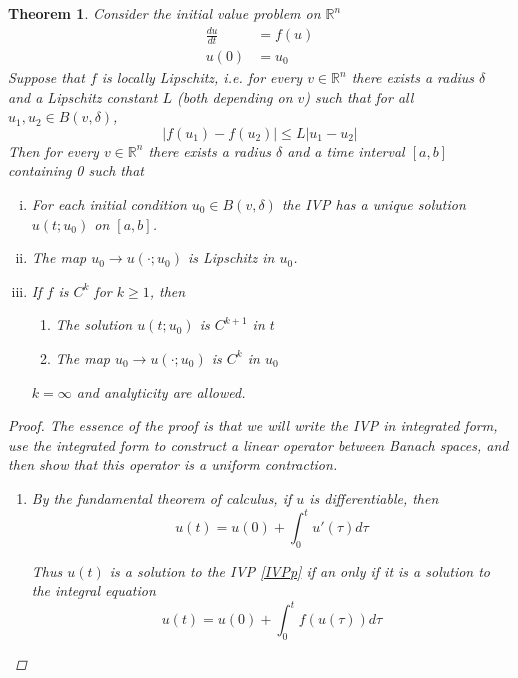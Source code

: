 \documentclass{article}
\newtheorem{theorem}{Theorem}[section]
\def\R{{\mathbb R}}
\begin{document}
\begin{theorem}
Consider the initial value problem on $\R^n$
\begin{align}\label{IVPp}
\frac{du}{dt} &= f(u) \\
u(0) &= u_0 \nonumber
\end{align}
Suppose that $f$ is locally Lipschitz, i.e. for every $v \in \R^n$ there exists a radius $\delta$ and a Lipschitz constant $L$ (both depending on $v$) such that for all $u_1, u_2 \in B(v, \delta)$,
\[
|f(u_1) - f(u_2)| \leq L|u_1 - u_2|
\]
Then for every $v \in \R^n$ there exists a radius $\delta$ and a time interval $[a, b]$ containing 0 such that
\begin{enumerate}[(i)]
\item For each initial condition $u_0 \in B(v, \delta)$ the IVP has a unique solution $u(t; u_0)$ on $[a, b]$.
\item The map $u_0 \rightarrow u(\cdot; u_0)$ is Lipschitz in $u_0$.
\item If $f$ is $C^k$ for $k \geq 1$, then
\begin{enumerate}
\item The solution $u(t; u_0)$ is $C^{k+1}$ in $t$
\item The map $u_0 \rightarrow u(\cdot; u_0)$ is $C^k$ in $u_0$
\end{enumerate}
$k = \infty$ and analyticity are allowed.
\end{enumerate}
\begin{proof}
The essence of the proof is that we will write the IVP in integrated form, use the integrated form to construct a linear operator between Banach spaces, and then show that this operator is a uniform contraction.
\begin{enumerate}
\item By the fundamental theorem of calculus, if $u$ is differentiable, then
\begin{equation*}
u(t) = u(0) + \int_0^t u'(\tau) d \tau
\end{equation*}

Thus $u(t)$ is a solution to the IVP \eqref{IVPp} if an only if it is a solution to the integral equation
\begin{equation}\label{intform}
u(t) = u(0) + \int_0^t f(u(\tau)) d \tau
\end{equation}



\end{enumerate}
\end{proof}
\end{theorem}
\end{document}
